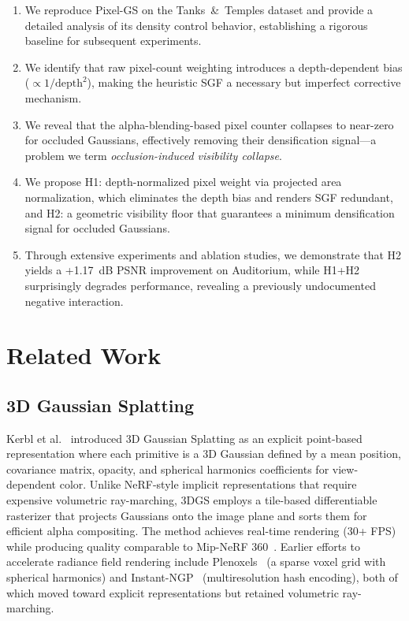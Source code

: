\documentclass[conference]{IEEEtran}
\begin{document}
\begin{enumerate}
    \item We reproduce Pixel-GS on the Tanks~\&~Temples dataset and provide a detailed analysis of its density control behavior, establishing a rigorous baseline for subsequent experiments.
    \item We identify that raw pixel-count weighting introduces a depth-dependent bias ($\propto 1/\text{depth}^2$), making the heuristic SGF a necessary but imperfect corrective mechanism.
    \item We reveal that the alpha-blending-based pixel counter collapses to near-zero for occluded Gaussians, effectively removing their densification signal—a problem we term \emph{occlusion-induced visibility collapse}.
    \item We propose H1: depth-normalized pixel weight via projected area normalization, which eliminates the depth bias and renders SGF redundant, and H2: a geometric visibility floor that guarantees a minimum densification signal for occluded Gaussians.
    \item Through extensive experiments and ablation studies, we demonstrate that H2 yields a +1.17~dB PSNR improvement on Auditorium, while H1+H2 surprisingly degrades performance, revealing a previously undocumented negative interaction.
\end{enumerate}

\section{Related Work}

\subsection{3D Gaussian Splatting}

Kerbl et al.~\cite{kerbl2023gaussian} introduced 3D Gaussian Splatting as an explicit point-based representation where each primitive is a 3D Gaussian defined by a mean position, covariance matrix, opacity, and spherical harmonics coefficients for view-dependent color. Unlike NeRF-style implicit representations that require expensive volumetric ray-marching, 3DGS employs a tile-based differentiable rasterizer that projects Gaussians onto the image plane and sorts them for efficient alpha compositing. The method achieves real-time rendering (30+ FPS) while producing quality comparable to Mip-NeRF 360~\cite{barron2022mipnerf360}. Earlier efforts to accelerate radiance field rendering include Plenoxels~\cite{yu2022plenoxels} (a sparse voxel grid with spherical harmonics) and Instant-NGP~\cite{muller2022instant} (multiresolution hash encoding), both of which moved toward explicit representations but retained volumetric ray-marching.
\end{document}
